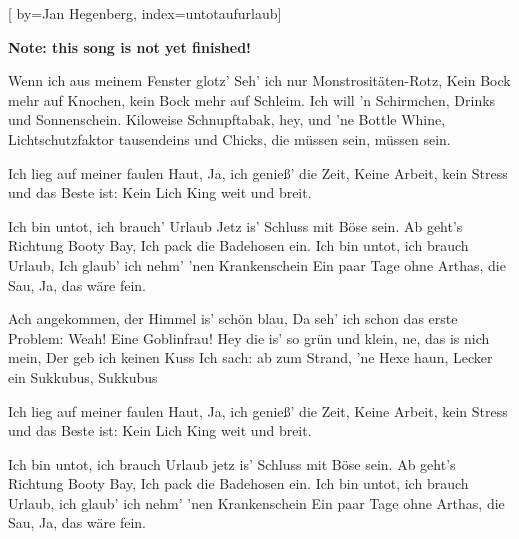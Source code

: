 
[%
    by={Jan Hegenberg},
    index={untotaufurlaub}]


    \label{untotaufurlaub}

    \textbf{Note: this song is not yet finished!}

    \beginverse
        Wenn ich aus meinem Fenster glotz'
        Seh' ich nur Monstrosit\"{a}ten-Rotz,
        Kein Bock mehr auf Knochen, kein Bock mehr auf Schleim.
        Ich will 'n Schirmchen, Drinks und Sonnenschein.
        Kiloweise Schnupftabak, hey, und 'ne Bottle Whine,
        Lichtschutzfaktor tausendeins und Chicks, die m\"{u}ssen sein, m\"{u}ssen sein.
    \endverse

    \beginverse*
        Ich lieg auf meiner faulen Haut,
        Ja, ich genie\ss{}' die Zeit,
        Keine Arbeit, kein Stress und das Beste ist:
        Kein Lich King weit und breit.
    \endverse

    \beginchorus
        Ich bin untot, ich brauch' Urlaub
        Jetz is' Schluss mit B\"{o}se sein.
        Ab geht's Richtung Booty Bay,
        Ich pack die Badehosen ein.
        Ich bin untot, ich brauch Urlaub,
        Ich glaub' ich nehm' 'nen Krankenschein
        Ein paar Tage ohne Arthas, die Sau,
        Ja, das w\"{a}re fein.
    \endchorus

    \beginverse
        Ach angekommen, der Himmel is' sch\"{o}n blau,
        Da seh' ich schon das erste Problem:
        Weah! Eine Goblinfrau!
        Hey die is' so gr\"{u}n und klein, ne, das is nich mein,
        Der geb ich keinen Kuss
        Ich sach: ab zum Strand, 'ne Hexe haun,
        Lecker ein Sukkubus, Sukkubus
    \endverse

    \beginverse*
        Ich lieg auf meiner faulen Haut,
        Ja, ich genie\ss{}' die Zeit,
        Keine Arbeit, kein Stress und das Beste ist:
        Kein Lich King weit und breit.
    \endverse

    \beginchorus
        Ich bin untot, ich brauch Urlaub
        jetz is' Schluss mit B\"{o}se sein.
        Ab geht's Richtung Booty Bay,
        Ich pack die Badehosen ein.
        Ich bin untot, ich brauch Urlaub,
        ich glaub' ich nehm' 'nen Krankenschein
        Ein paar Tage ohne Arthas, die Sau,
        Ja, das w\"{a}re fein.
    \endchorus

